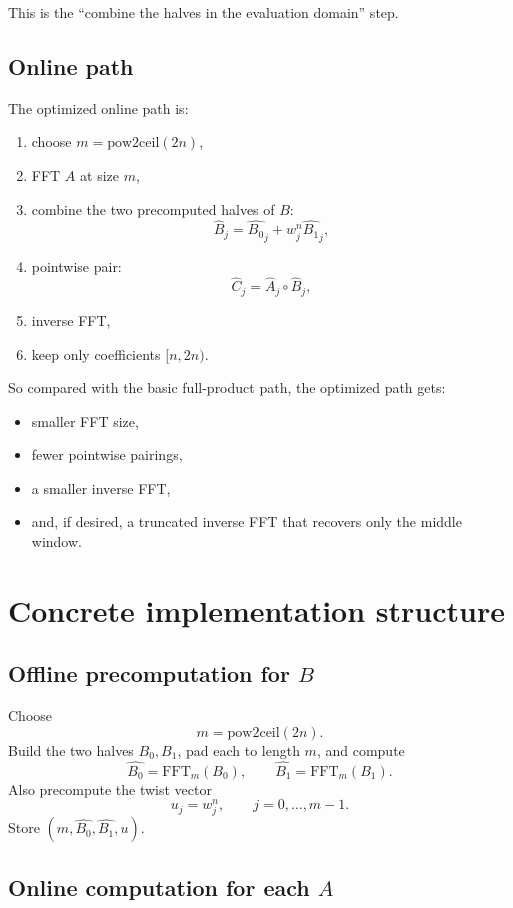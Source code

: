 \documentclass[11pt]{article}
\begin{document}
This is the ``combine the halves in the evaluation domain'' step.

\subsection{Online path}

The optimized online path is:
\begin{enumerate}[itemsep=0.3em, topsep=0.4em]
  \item choose $m = \mathrm{pow2ceil}(2n)$,
  \item FFT $A$ at size $m$,
  \item combine the two precomputed halves of $B$:
  \[
  \widehat{B}_j = \widehat{B_0}_j + w_j^n \widehat{B_1}_j,
  \]
  \item pointwise pair:
  \[
  \widehat{C}_j = \widehat{A}_j \circ \widehat{B}_j,
  \]
  \item inverse FFT,
  \item keep only coefficients $[n,2n)$.
\end{enumerate}

So compared with the basic full-product path, the optimized path gets:
\begin{itemize}[itemsep=0.3em, topsep=0.4em]
  \item smaller FFT size,
  \item fewer pointwise pairings,
  \item a smaller inverse FFT,
  \item and, if desired, a truncated inverse FFT that recovers only the middle window.
\end{itemize}

\section{Concrete implementation structure}

\subsection{Offline precomputation for $B$}

Choose
\[
m = \mathrm{pow2ceil}(2n).
\]
Build the two halves $B_0, B_1$, pad each to length $m$, and compute
\[
\widehat{B_0} = \mathrm{FFT}_m(B_0),
\qquad
\widehat{B_1} = \mathrm{FFT}_m(B_1).
\]
Also precompute the twist vector
\[
u_j = w_j^n,
\qquad j=0,\dots,m-1.
\]
Store $(m, \widehat{B_0}, \widehat{B_1}, u)$.

\subsection{Online computation for each $A$}
\end{document}
